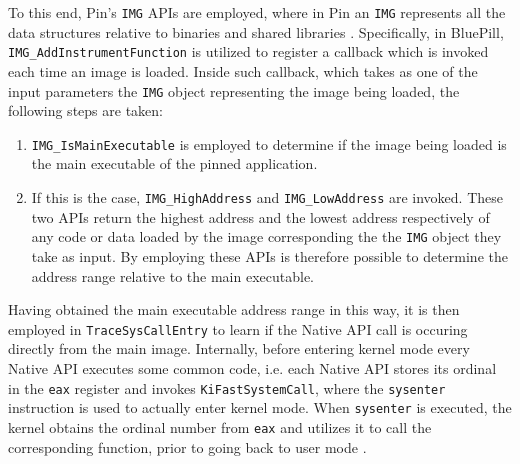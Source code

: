To this end, Pin's \texttt{IMG} APIs are employed, where in Pin an \texttt{IMG} represents all the data structures relative to binaries and shared libraries \cite{Pin}. Specifically, in BluePill, \texttt{IMG\_AddInstrumentFunction} is utilized to register a callback which is invoked each time an image is loaded. Inside such callback, which takes as one of the input parameters the \texttt{IMG} object representing the image being loaded, the following steps are taken:
\begin{enumerate}
\item \texttt{IMG\_IsMainExecutable} is employed to determine if the image being loaded is the main executable of the pinned application.
\item If this is the case, \texttt{IMG\_HighAddress} and \texttt{IMG\_LowAddress} are invoked. These two APIs return the highest address and the lowest address respectively of any code or data loaded by the image corresponding the the \texttt{IMG} object they take as input. By employing these APIs is therefore possible to determine the address range relative to the main executable. 
\end{enumerate}  

Having obtained the main executable address range in this way, it is then employed in \texttt{TraceSysCallEntry} to learn if the Native API call is occuring directly from the main image. Internally, before entering kernel mode every Native API executes some common code, i.e. each Native API stores its ordinal in the \texttt{eax} register and invokes \texttt{KiFastSystemCall}, where the \texttt{sysenter} instruction is used to actually enter kernel mode. When \texttt{sysenter} is executed, the kernel obtains the ordinal number from \texttt{eax} and utilizes it to call the corresponding function, prior to going back to user mode \cite{MalwareTech}.

